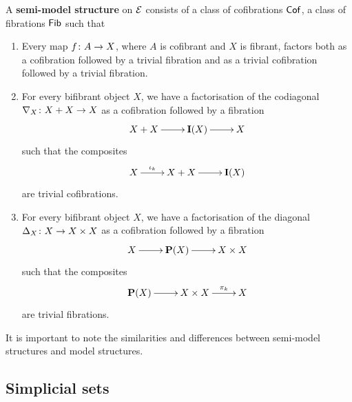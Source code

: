 \documentclass[reqno,10pt,a4paper,oneside,draft]{amsart}
\begin{document}
\begin{definition} A {\bf semi-model structure} on $\cal{E}$ consists of a class of cofibrations $\Cof$, a class of
fibrations $\Fib$ such that
\begin{enumerate}[(SM1)]
\item Every map $f \co A \to X$, where $A$ is cofibrant and $X$ is fibrant, factors both as a
cofibration followed by a trivial fibration and as a trivial cofibration followed by a trivial fibration.
\item For every bifibrant object $X$, we have a factorisation of the codiagonal $\nabla_X \co 
X + X \to X$ as a cofibration followed by a fibration 
\[
\xymatrix{X + X \ar[r] &  {\bf I}(X) \ar[r] & X}
\]
such that the composites 
\[
\xymatrix{X \ar[r]^-{\iota_k}  & X+X \ar[r] & {\bf I }(X)}
\]
are trivial cofibrations.
\item For every bifibrant object $X$, we have a factorisation of the diagonal $\Delta_X \co X \to 
X \times X$ as a cofibration followed by a fibration
\[
\xymatrix{X  \ar[r]  & {\bf P}(X) \ar[r] & X \times X }
 \]
 such that the composites
\[
\xymatrix{ {\bf P}(X) \ar[r] &  X \times X \ar[r]^-{\pi_k} &  X }
\]
are trivial fibrations.
\end{enumerate}
\end{definition}

\bigskip



It is important to note the similarities and differences between semi-model structures and model
structures. 

\subsection*{Simplicial sets} 
\end{document}
